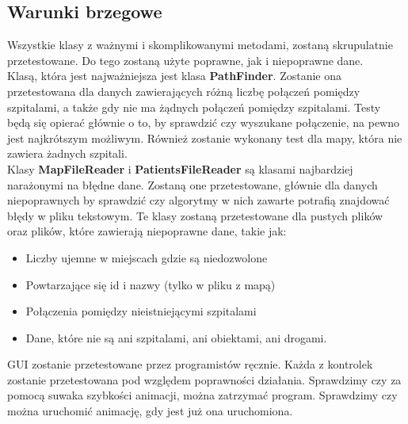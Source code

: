 \documentclass[]{article}
\begin{document}
        \subsection{Warunki brzegowe}
            Wszystkie klasy z ważnymi i skomplikowanymi metodami, zostaną skrupulatnie przetestowane. Do tego zostaną użyte poprawne, jak i niepoprawne dane.
            \\
            Klasą, która jest najważniejsza jest klasa \textbf{PathFinder}. 
            Zostanie ona przetestowana dla danych zawierających różną liczbę połączeń pomiędzy szpitalami, a także gdy nie ma żądnych połączeń pomiędzy szpitalami.
            Testy będą się opierać głównie o to, by sprawdzić czy wyszukane połączenie, na pewno jest najkrótszym możliwym.
            Również zostanie wykonany test dla mapy, która nie zawiera żadnych szpitali.
            \\
            Klasy \textbf{MapFileReader} i \textbf{PatientsFileReader} są klasami najbardziej narażonymi na błędne dane.
            Zostaną one przetestowane, głównie dla danych niepoprawnych by sprawdzić
            czy algorytmy w nich zawarte potrafią znajdować błędy w pliku tekstowym.
            Te klasy zostaną przetestowane dla pustych plików oraz plików, które zawierają niepoprawne dane, takie jak:
            \begin{itemize}
                \item Liczby ujemne w miejscach gdzie są niedozwolone
                \item Powtarzające się id i nazwy (tylko w pliku z mapą)
                \item Połączenia pomiędzy nieistniejącymi szpitalami
                \item Dane, które nie są ani szpitalami, ani obiektami, ani drogami.
            \end{itemize}
            GUI zostanie przetestowane przez programistów ręcznie.
            Każda z kontrolek zostanie przetestowana pod względem poprawności działania.
            Sprawdzimy czy za pomocą suwaka szybkości animacji, można zatrzymać program.
            Sprawdzimy czy można uruchomić animację, gdy jest już ona uruchomiona.
\end{document}
